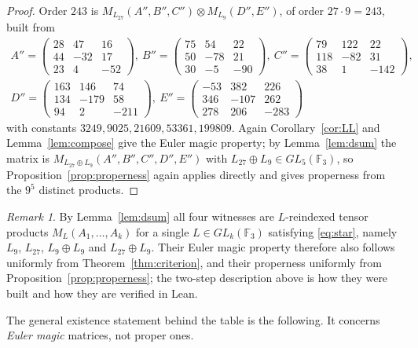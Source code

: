 \documentclass[11pt,a4paper]{amsart}
\theoremstyle{plain}
\theoremstyle{definition}
\theoremstyle{remark}
\newtheorem{remark}[theorem]{Remark}
\newcommand{\FF}{\mathbb{F}}
\begin{document}
\begin{proof}
Order $243$ is $M_{L_{27}}(A'',B'',C'')\otimes M_{L_9}(D'',E'')$, of order
$27\cdot9=243$, built from
\[
\begin{gathered}
A''=\begin{pmatrix}28&47&16\\44&-32&17\\23&4&-52\end{pmatrix},\
B''=\begin{pmatrix}75&54&22\\50&-78&21\\30&-5&-90\end{pmatrix},\
C''=\begin{pmatrix}79&122&22\\118&-82&31\\38&1&-142\end{pmatrix},\\[2pt]
D''=\begin{pmatrix}163&146&74\\134&-179&58\\94&2&-211\end{pmatrix},\
E''=\begin{pmatrix}-53&382&226\\346&-107&262\\278&206&-283\end{pmatrix}
\end{gathered}
\]
with constants $3249,9025,21609,53361,199809$. Again
Corollary~\ref{cor:LL} and Lemma~\ref{lem:compose} give the Euler magic
property; by Lemma~\ref{lem:dsum} the matrix is
$M_{L_{27}\oplus L_9}(A'',B'',C'',D'',E'')$ with
$L_{27}\oplus L_9\in GL_5(\FF_3)$, so Proposition~\ref{prop:properness} again
applies directly and gives properness from the $9^5$ distinct products.
\end{proof}

\begin{remark}
By Lemma~\ref{lem:dsum} all four witnesses are $L$-reindexed tensor products
$M_L(A_1,\dots,A_k)$ for a single $L\in GL_k(\FF_3)$ satisfying \eqref{eq:star},
namely $L_9$, $L_{27}$, $L_9\oplus L_9$ and $L_{27}\oplus L_9$. Their Euler
magic property therefore also follows uniformly from
Theorem~\ref{thm:criterion}, and their properness uniformly from
Proposition~\ref{prop:properness}; the two-step description above is how they
were built and how they are verified in Lean.
\end{remark}

The general existence statement behind the table is the following. It concerns
\emph{Euler magic} matrices, not proper ones.
\end{document}
